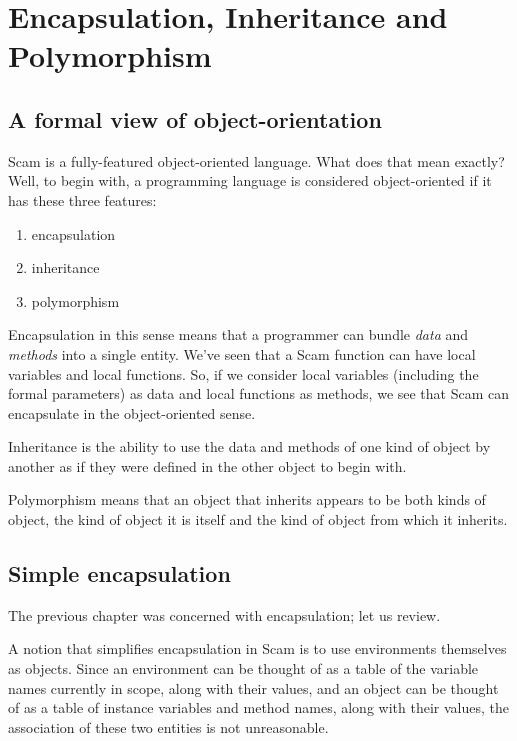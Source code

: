 \chapter{Encapsulation, Inheritance and Polymorphism}
\label{Inheritance}

\section{A formal view of object-orientation}

Scam is a fully-featured object-oriented language. What does
that mean exactly? Well, to begin with, a programming language
is considered object-oriented if it has these
three features:

\begin{enumerate}
\item
    encapsulation
\item
    inheritance
\item
    polymorphism
\end{enumerate}

Encapsulation in this sense means that a programmer
can bundle {\it data} and {\it methods} into a single entity.
We've seen that a Scam function can
have local variables and local functions.
So, if we consider local variables (including the formal
parameters) as data and local
functions as methods, we see that Scam can encapsulate
in the object-oriented sense.

Inheritance is the ability to use the data and methods
of one kind of object by another as if they were defined
in the other object to begin with.

Polymorphism means that an object that inherits appears
to be both kinds of object, the kind of object it is
itself and the kind of object from which it inherits.

\section{Simple encapsulation}

The previous chapter was concerned with encapsulation;
let us review.

A notion that simplifies encapsulation in Scam is to use
environments themselves as objects. Since an environment can be thought
of as a table of the variable names currently in scope, along with their
values, and an object can be thought of as a table of instance variables
and method names, along with their values, the association of these two
entities is not unreasonable.

